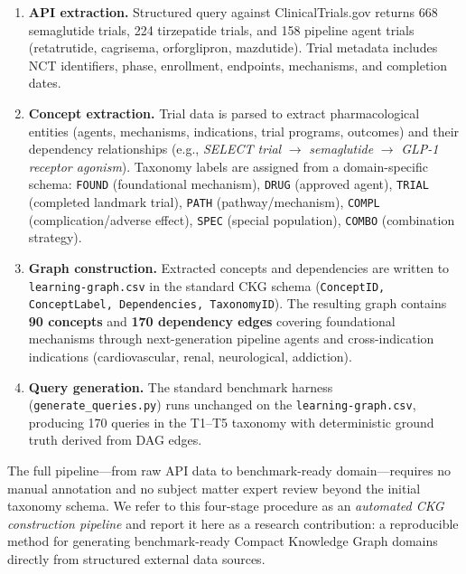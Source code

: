 \begin{enumerate}[leftmargin=2em]
  \item \textbf{API extraction.} Structured query against ClinicalTrials.gov
        returns 668 semaglutide trials, 224 tirzepatide trials, and 158
        pipeline agent trials (retatrutide, cagrisema, orforglipron, mazdutide).
        Trial metadata includes NCT identifiers, phase, enrollment, endpoints,
        mechanisms, and completion dates.

  \item \textbf{Concept extraction.} Trial data is parsed to extract
        pharmacological entities (agents, mechanisms, indications, trial
        programs, outcomes) and their dependency relationships (e.g.,
        \textit{SELECT trial} $\to$ \textit{semaglutide} $\to$
        \textit{GLP-1 receptor agonism}). Taxonomy labels are assigned
        from a domain-specific schema: \texttt{FOUND} (foundational
        mechanism), \texttt{DRUG} (approved agent), \texttt{TRIAL}
        (completed landmark trial), \texttt{PATH} (pathway/mechanism),
        \texttt{COMPL} (complication/adverse effect), \texttt{SPEC}
        (special population), \texttt{COMBO} (combination strategy).

  \item \textbf{Graph construction.} Extracted concepts and dependencies
        are written to \texttt{learning-graph.csv} in the standard CKG
        schema (\texttt{ConceptID, ConceptLabel, Dependencies, TaxonomyID}).
        The resulting graph contains \textbf{90 concepts} and \textbf{170
        dependency edges} covering foundational mechanisms through
        next-generation pipeline agents and cross-indication indications
        (cardiovascular, renal, neurological, addiction).

  \item \textbf{Query generation.} The standard benchmark harness
        (\texttt{generate\_queries.py}) runs unchanged on the
        \texttt{learning-graph.csv}, producing 170 queries in the T1--T5
        taxonomy with deterministic ground truth derived from DAG edges.
\end{enumerate}

The full pipeline---from raw API data to benchmark-ready domain---requires
no manual annotation and no subject matter expert review beyond the
initial taxonomy schema. We refer to this four-stage procedure as an
\textit{automated CKG construction pipeline} and report it here as a
research contribution: a reproducible method for generating
benchmark-ready Compact Knowledge Graph domains directly from
structured external data sources.

